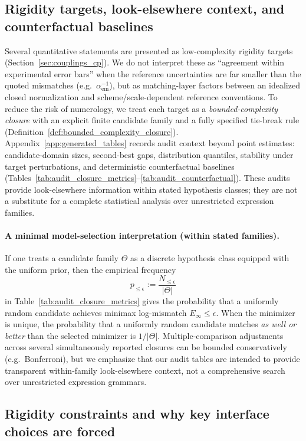 \subsection{Rigidity targets, look-elsewhere context, and counterfactual baselines}
Several quantitative statements are presented as low-complexity rigidity targets (Section~\ref{sec:couplings_cp}).
We do not interpret these as ``agreement within experimental error bars'' when the reference uncertainties are far smaller than the quoted mismatches (e.g.\ $\alpha_{\mathrm{em}}^{-1}$), but as matching-layer factors between an idealized closed normalization and scheme/scale-dependent reference conventions.
To reduce the risk of numerology, we treat each target as a \emph{bounded-complexity closure} with an explicit finite candidate family and a fully specified tie-break rule (Definition~\ref{def:bounded_complexity_closure}).
Appendix~\ref{app:generated_tables} records audit context beyond point estimates:
candidate-domain sizes, second-best gaps, distribution quantiles, stability under target perturbations, and deterministic counterfactual baselines (Tables~\ref{tab:audit_closure_metrics}--\ref{tab:audit_counterfactual}).
These audits provide look-elsewhere information within stated hypothesis classes; they are not a substitute for a complete statistical analysis over unrestricted expression families.
\paragraph{A minimal model-selection interpretation (within stated families).}
If one treats a candidate family $\Theta$ as a discrete hypothesis class equipped with the uniform prior, then the empirical frequency
\[
p_{\le \epsilon}:=\frac{N_{\le \epsilon}}{|\Theta|}
\]
in Table~\ref{tab:audit_closure_metrics} gives the probability that a uniformly random candidate achieves minimax log-mismatch $E_\infty\le \epsilon$.
When the minimizer is unique, the probability that a uniformly random candidate matches \emph{as well or better} than the selected minimizer is $1/|\Theta|$.
Multiple-comparison adjustments across several simultaneously reported closures can be bounded conservatively (e.g.\ Bonferroni), but we emphasize that our audit tables are intended to provide transparent within-family look-elsewhere context, not a comprehensive search over unrestricted expression grammars.

\subsection{Rigidity constraints and why key interface choices are forced}
\label{subsec:rigidity_constraints_forced}

